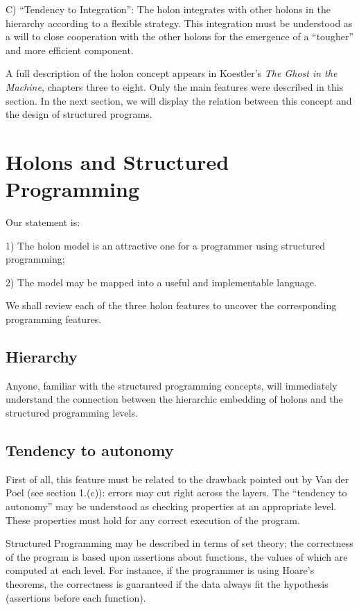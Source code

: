 \documentclass[openany,nobib]{tufte-book}
\begin{document}
C) ``Tendency to Integration'': The holon integrates with other holons in the
hierarchy according to a flexible strategy. This integration must be understood
as a will to close cooperation with the other holons for the emergence of a
``tougher'' and more efficient component.

A full description of the holon concept appears in Koestler's {\it The Ghost in
the Machine}, chapters three to eight. Only the main features were described in
this section. In the next section, we will display the relation between this
concept and the design of structured programs.

\chapter{Holons and Structured Programming}

Our statement is:

1) The holon model is an attractive one for a programmer using structured
programming;

2) The model may be mapped into a useful and implementable language.

\medskip

\noindent We shall review each of the three holon features to uncover the
corresponding programming features.

\section{Hierarchy}

Anyone, familiar with the structured programming concepts, will immediately
understand the connection between the hierarchic embedding of holons and the
structured programming levels.

\section{Tendency to autonomy}

First of all, this feature must be related to the drawback pointed out by Van
der Poel (see section 1.(c)): errors may cut right across the
layers.\autocite{naur1969software} The ``tendency to autonomy'' may be
understood as checking properties at an appropriate level. These properties
must hold for any correct execution of the program.

Structured Programming may be described in terms of set
theory;\autocite{mills1972mathematical} the correctness of the program is based
upon assertions about functions, the values of which are computed at each
level. For instance, if the programmer is using Hoare's
theorems,\autocite{dijkstra1971short} the correctness is guaranteed if the data
always fit the hypothesis (assertions before each function).
\end{document}
